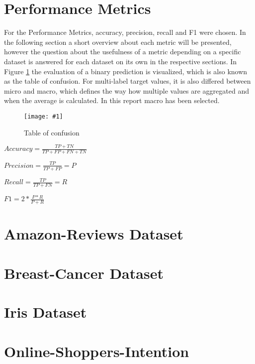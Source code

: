 \documentclass{article}
\newcommand{\size}{0.6\textwidth}
\newcommand{\image}[3]{
\begin{figure}[H]
\begin{center}
\texttt{[image: \#1]}
\caption{#2}
#3
\end{center}
\end{figure}
}
\begin{document}
\section{Performance Metrics}
For the Performance Metrics, accuracy, precision, recall and F1 were chosen. In the following section a short overview about each metric will be presented, however the question about the usefulness of a metric depending on a specific dataset is answered for each dataset on its own in the respective sections. In Figure \ref{fig:conf} the evaluation of a binary prediction is visualized, which is also known as the table of confusion. For multi-label target values, it is also differed between micro and macro, which defines the way how multiple values are aggregated and when the average is calculated. In this report macro has been selected.

\image{performance.png}{Table of confusion}{\label{fig:conf}}
\begin{itemize}
\Large{
\item $Accuracy = \frac{TP + TN}{TP + FP + FN + TN}$

\item $Precision = \frac{TP}{TP+FP} = P$

\item $Recall = \frac{TP}{TP+FN} = R$

\item $F1=2*\frac{P*R}{P+R}$
}
\end{itemize}

\section{Amazon-Reviews Dataset}


\section{Breast-Cancer Dataset}


\section{Iris Dataset}


\section{Online-Shoppers-Intention}


\end{document}
